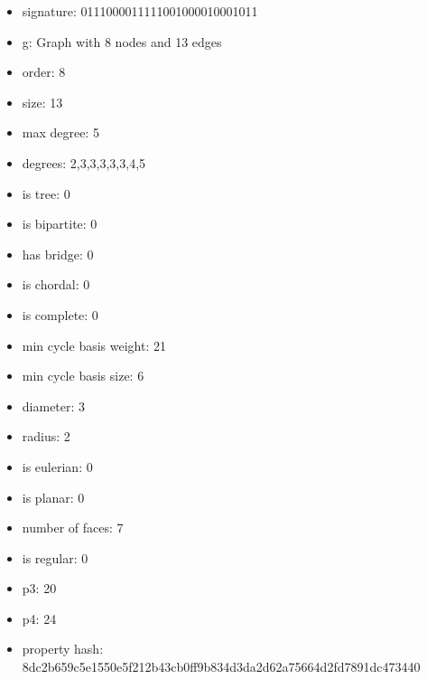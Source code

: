 \begin{itemize}
\item signature: 0111000011111001000010001011
\item g: Graph with 8 nodes and 13 edges
\item order: 8
\item size: 13
\item max degree: 5
\item degrees: 2,3,3,3,3,3,4,5
\item is tree: 0
\item is bipartite: 0
\item has bridge: 0
\item is chordal: 0
\item is complete: 0
\item min cycle basis weight: 21
\item min cycle basis size: 6
\item diameter: 3
\item radius: 2
\item is eulerian: 0
\item is planar: 0
\item number of faces: 7
\item is regular: 0
\item p3: 20
\item p4: 24
\item property hash: 8dc2b659c5e1550e5f212b43cb0ff9b834d3da2d62a75664d2fd7891dc473440
\end{itemize}
\newpage
\begin{figure}
\end{figure}
